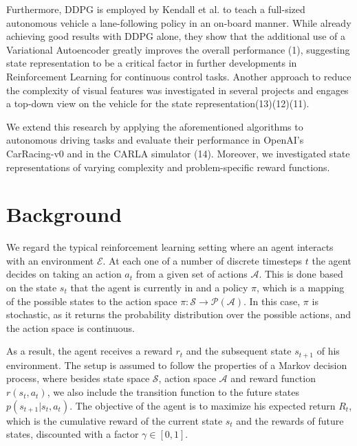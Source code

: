 \documentclass[letterpaper, 10 pt, conference]{ieeeconf}  %
\begin{document}
Furthermore, DDPG is  employed  by Kendall et al. to teach a full-sized autonomous vehicle a lane-following policy in an on-board manner. While already achieving good results with DDPG alone, they show that the additional use of a Variational Autoencoder greatly improves the overall performance (1), suggesting state representation to be a critical factor in further developments in Reinforcement Learning for continuous control tasks. Another approach to reduce the complexity of visual features was investigated in several projects and engages a top-down view on the vehicle for the state representation(13)(12)(11).

We extend this research by applying the aforementioned algorithms to autonomous driving tasks and evaluate their performance in OpenAI's CarRacing-v0 and in the CARLA simulator (14). Moreover, we investigated state representations of varying complexity and problem-specific reward functions.


\section{Background}

We regard the typical reinforcement learning setting where an agent interacts with an environment $\mathcal{E}$. At each one of a number of discrete timesteps $t$ the agent decides on taking an action $a_t$ from a given set of actions $\mathcal{A}$. This is done based on the state $s_t$ that the agent is currently in and a policy $\pi$, which is a mapping of the possible states to the action space $\pi: \mathcal{S} \rightarrow \mathcal{P}(\mathcal{A})$. In this case, $\pi$ is stochastic, as it returns the probability distribution over the possible actions, and the action space is continuous.

As a result, the agent receives a reward $r_t$ and the subsequent state $s_{t+1}$ of his environment. The setup is assumed to follow the properties of a Markov decision process, where besides state space $\mathcal{S}$, action space $\mathcal{A}$ and reward function $r(s_t,a_t)$, we also include the transition function to the future states $p(s_{t+1}|s_t,a_t)$. The objective of the agent is to maximize his expected return $R_t$, which is the cumulative reward of the current state $s_t$ and the rewards of future states, discounted with a factor $\gamma \in [0,1]$.
\end{document}
